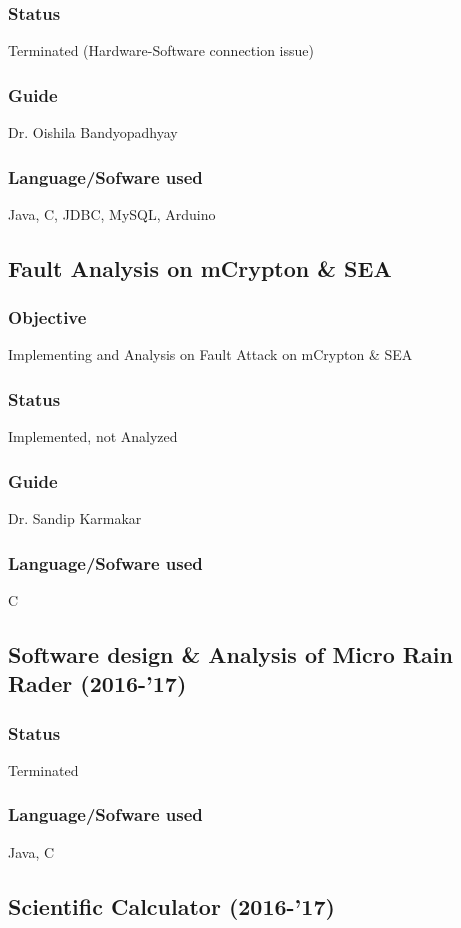 \documentclass{article}
\begin{document}
\subsubsection{Status} Terminated (Hardware-Software connection issue)
\subsubsection{Guide} Dr. Oishila Bandyopadhyay
\subsubsection{Language/Sofware used} Java, C, JDBC, MySQL, Arduino

\subsection{Fault Analysis on mCrypton \& SEA}
\subsubsection{Objective} Implementing and Analysis on Fault Attack on mCrypton \& SEA
\subsubsection{Status} Implemented, not Analyzed
\subsubsection{Guide} Dr. Sandip Karmakar
\subsubsection{Language/Sofware used} C

\subsection{Software design \& Analysis of Micro Rain Rader (2016-'17)}
\subsubsection{Status}	Terminated
\subsubsection{Language/Sofware used} Java, C

\subsection{Scientific Calculator (2016-'17)}
\end{document}
